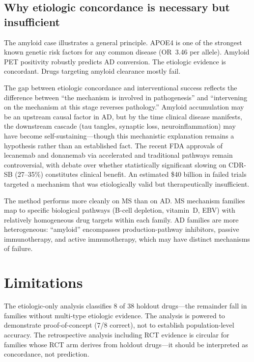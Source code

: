 \documentclass[11pt]{article}
\begin{document}
\subsection{Why etiologic concordance is necessary but insufficient}

The amyloid case illustrates a general principle. APOE4 is one of the strongest known genetic risk factors for any common disease (OR~3.46 per allele). Amyloid PET positivity robustly predicts AD conversion. The etiologic evidence is concordant. Drugs targeting amyloid clearance mostly fail.

The gap between etiologic concordance and interventional success reflects the difference between ``the mechanism is involved in pathogenesis'' and ``intervening on the mechanism at this stage reverses pathology.'' Amyloid accumulation may be an upstream causal factor in AD, but by the time clinical disease manifests, the downstream cascade (tau tangles, synaptic loss, neuroinflammation) may have become self-sustaining---though this mechanistic explanation remains a hypothesis rather than an established fact. The recent FDA approvals of lecanemab and donanemab via accelerated and traditional pathways remain controversial, with debate over whether statistically significant slowing on CDR-SB (27--35\%) constitutes clinical benefit. An estimated \$40 billion in failed trials \citep{cummings_zhong2014} targeted a mechanism that was etiologically valid but therapeutically insufficient.

The method performs more cleanly on MS than on AD. MS mechanism families map to specific biological pathways (B-cell depletion, vitamin~D, EBV) with relatively homogeneous drug targets within each family. AD families are more heterogeneous: ``amyloid'' encompasses production-pathway inhibitors, passive immunotherapy, and active immunotherapy, which may have distinct mechanisms of failure.

\section{Limitations}

The etiologic-only analysis classifies 8 of 38 holdout drugs---the remainder fall in families without multi-type etiologic evidence. The analysis is powered to demonstrate proof-of-concept (7/8 correct), not to establish population-level accuracy. The retrospective analysis including RCT evidence is circular for families whose RCT arm derives from holdout drugs---it should be interpreted as concordance, not prediction.
\end{document}
